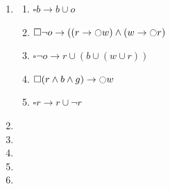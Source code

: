 \documentclass[a4paper,12pt]{article}
\begin{document}
\begin{enumerate}
\begin{enumerate}
			\end{enumerate}
		\item \begin{enumerate}
			\item $\square b \rightarrow b \cup o$
			\item $\square \neg o \rightarrow ((r \rightarrow \ocircle w) \wedge (w \rightarrow \ocircle r)$
			\item $\square \neg o \rightarrow r \cup (b \cup (w \cup r))$
			\item $\square (r \wedge b \wedge g) \rightarrow \ocircle w$
			\item $\square r \rightarrow r \cup \neg r$
		\end{enumerate}
		\item 
		\item 
		\item 
		\item 
		\item 
	\end{enumerate}
	
\end{document}
